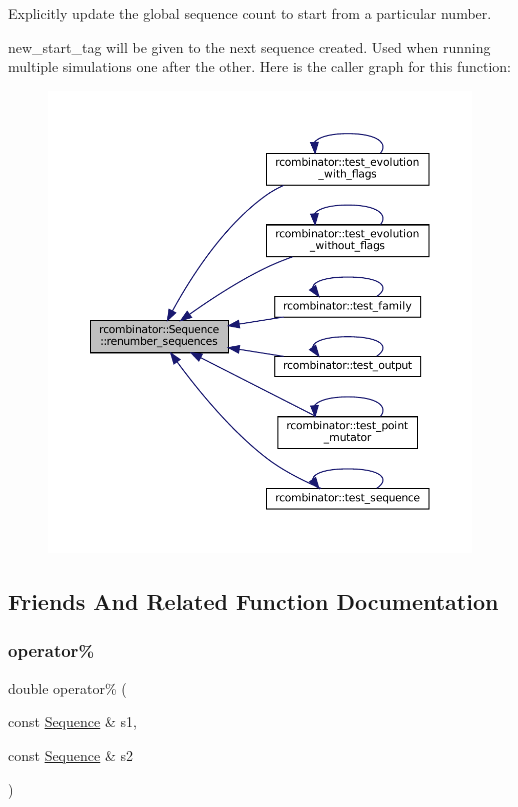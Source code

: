 Explicitly update the global sequence count to start from a particular number. 

new\+\_\+start\+\_\+tag will be given to the next sequence created. Used when running multiple simulations one after the other. Here is the caller graph for this function\+:
\nopagebreak
\begin{figure}[H]
\begin{center}
\leavevmode
\includegraphics[width=350pt]{classrcombinator_1_1Sequence_ad4791ec3cefbea417081cd349ac6c23b_icgraph}
\end{center}
\end{figure}


\subsection{Friends And Related Function Documentation}
\mbox{\label{classrcombinator_1_1Sequence_a951eb38b75bb0b9a808e3a8bc7170a09}} 
\subsubsection{\texorpdfstring{operator\%}{operator\%}}
{\footnotesize\ttfamily double operator\% (\begin{DoxyParamCaption}\item[{const \mbox{\hyperlink{classrcombinator_1_1Sequence}{Sequence}} \&}]{s1,  }\item[{const \mbox{\hyperlink{classrcombinator_1_1Sequence}{Sequence}} \&}]{s2 }\end{DoxyParamCaption})\hspace{0.3cm}{\ttfamily [friend]}}



